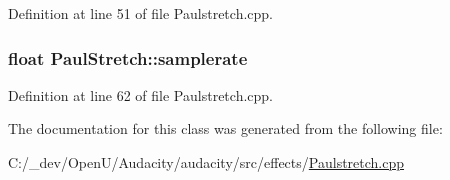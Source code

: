 Definition at line 51 of file Paulstretch.\+cpp.

\subsubsection[{\texorpdfstring{samplerate}{samplerate}}]{\setlength{\rightskip}{0pt plus 5cm}float Paul\+Stretch\+::samplerate\hspace{0.3cm}{\ttfamily [protected]}}\hypertarget{class_paul_stretch_a7dcfad1c7bbf1c31bd65abe20fcc760c}{}\label{class_paul_stretch_a7dcfad1c7bbf1c31bd65abe20fcc760c}


Definition at line 62 of file Paulstretch.\+cpp.



The documentation for this class was generated from the following file\+:\begin{DoxyCompactItemize}
\item 
C\+:/\+\_\+dev/\+Open\+U/\+Audacity/audacity/src/effects/\hyperlink{_paulstretch_8cpp}{Paulstretch.\+cpp}\end{DoxyCompactItemize}
